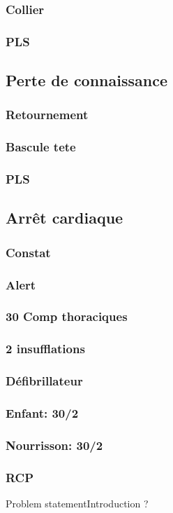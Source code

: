 	\subsubsection{Collier}
	\subsubsection{PLS}


 \subsection{Perte de connaissance}
 	\subsubsection{Retournement}
	\subsubsection{Bascule tete}
	\subsubsection{PLS}


 \subsection{Arrêt cardiaque}
 	\subsubsection{Constat}
 	\subsubsection{Alert}
	\subsubsection{30 Comp thoraciques}
	\subsubsection{2 insufflations}
	\subsubsection{Défibrillateur}
	\subsubsection{Enfant: 30/2}
	\subsubsection{Nourrisson: 30/2}
	\subsubsection{RCP}








\begin{frame}{Problem statement}{Introduction \cite{dimartino_internet_2018} ?}

\end{frame}



